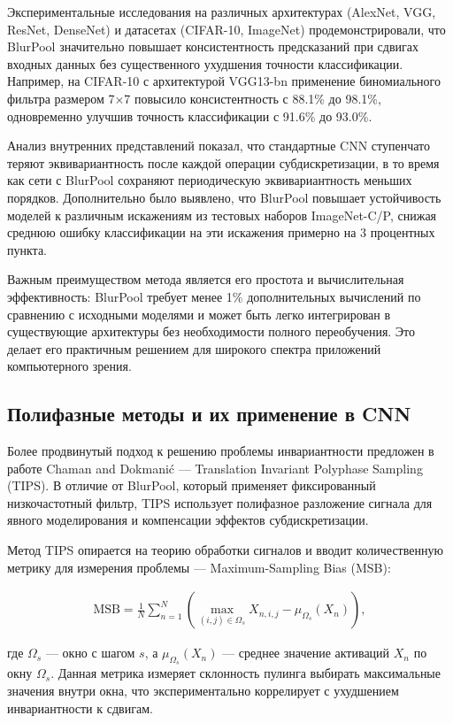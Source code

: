 Экспериментальные исследования на различных архитектурах (AlexNet, VGG, ResNet, DenseNet) и датасетах (CIFAR-10, ImageNet) продемонстрировали, что BlurPool значительно повышает консистентность предсказаний при сдвигах входных данных без существенного ухудшения точности классификации. Например, на CIFAR-10 с архитектурой VGG13-bn применение биномиального фильтра размером 7×7 повысило консистентность с 88.1\% до 98.1\%, одновременно улучшив точность классификации с 91.6\% до 93.0\%.

Анализ внутренних представлений показал, что стандартные CNN ступенчато теряют эквивариантность после каждой операции субдискретизации, в то время как сети с BlurPool сохраняют периодическую эквивариантность меньших порядков. Дополнительно было выявлено, что BlurPool повышает устойчивость моделей к различным искажениям из тестовых наборов ImageNet-C/P, снижая среднюю ошибку классификации на эти искажения примерно на 3 процентных пункта.

Важным преимуществом метода является его простота и вычислительная эффективность: BlurPool требует менее 1\% дополнительных вычислений по сравнению с исходными моделями и может быть легко интегрирован в существующие архитектуры без необходимости полного переобучения. Это делает его практичным решением для широкого спектра приложений компьютерного зрения.

\subsection{Полифазные методы и их применение в CNN}
\label{review:antialias:tips_and_applications}

Более продвинутый подход к решению проблемы инвариантности предложен в работе Chaman and Dokmanić \cite{Chaman2021} — Translation Invariant Polyphase Sampling (TIPS). В отличие от BlurPool, который применяет фиксированный низкочастотный фильтр, TIPS использует полифазное разложение сигнала для явного моделирования и компенсации эффектов субдискретизации.

Метод TIPS опирается на теорию обработки сигналов и вводит количественную метрику для измерения проблемы — Maximum-Sampling Bias (MSB):

\begin{multline}
  \text{MSB} = \frac{1}{N}\sum_{n=1}^{N}\left(\max_{(i,j)\in\Omega_s}X_{n,i,j} - \mu_{\Omega_s}(X_n)\right),
\end{multline}

где $\Omega_s$ — окно с шагом $s$, а $\mu_{\Omega_s}(X_n)$ — среднее значение активаций $X_n$ по окну $\Omega_s$. Данная метрика измеряет склонность пулинга выбирать максимальные значения внутри окна, что экспериментально коррелирует с ухудшением инвариантности к сдвигам.

